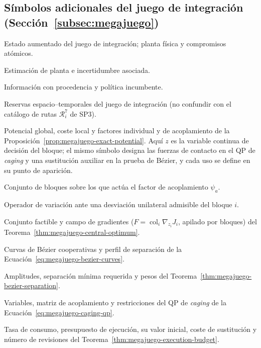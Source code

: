 \subsection*{Símbolos adicionales del juego de integración (Sección~\ref{subsec:megajuego})}
\begin{description}[style=multiline,leftmargin=8.2em,labelwidth=7.2em,itemsep=0.15em,parsep=0pt]
  \item[$Y,X,d$] Estado aumentado del juego de integración; planta física y compromisos atómicos.
  \item[$\widehat X,\mathcal E_X$] Estimación de planta e incertidumbre asociada.
  \item[$\mathcal I,\Pi^{\mathrm{inc}}$] Información con procedencia y política incumbente.
  \item[$\mathcal S$] Reservas espacio--temporales del juego de integración (no confundir con el catálogo de rutas $\mathcal R_i^7$ de SP3).
  \item[$\Phi(d,z),J_i,\phi_i,\psi_a$] Potencial global, coste local y factores individual y de acoplamiento de la Proposición~\ref{prop:megajuego-exact-potential}. Aquí $z$ es la variable continua de decisión del bloque; el mismo símbolo designa las fuerzas de contacto en el QP de \emph{caging} y una sustitución auxiliar en la prueba de Bézier, y cada uso se define en su punto de aparición.
  \item[$\mathcal I_a$] Conjunto de bloques sobre los que actúa el factor de acoplamiento $\psi_a$.
  \item[$\Delta_i$] Operador de variación ante una desviación unilateral admisible del bloque $i$.
  \item[$K,F$] Conjunto factible y campo de gradientes ($F=\operatorname{col}_i\nabla_{z_i}J_i$, apilado por bloques) del Teorema~\ref{thm:megajuego-central-optimum}.
  \item[$P_A(s),P_B(s),b(s)$] Curvas de Bézier cooperativas y perfil de separación de la Ecuación~\eqref{eq:megajuego-bezier-curves}.
  \item[$a_A,a_B,D,h_A,h_B$] Amplitudes, separación mínima requerida y pesos del Teorema~\ref{thm:megajuego-bezier-separation}.
  \item[$z,A,H,g$] Variables, matriz de acoplamiento y restricciones del QP de \emph{caging} de la Ecuación~\eqref{eq:megajuego-caging-qp}.
  \item[$\kappa_W,W,W_0,\delta,N_{\mathrm{rev}}$] Tasa de consumo, presupuesto de ejecución, su valor inicial, coste de sustitución y número de revisiones del Teorema~\ref{thm:megajuego-execution-budget}.
\end{description}
